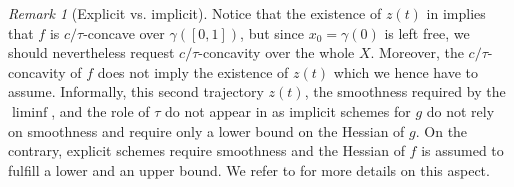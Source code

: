 \documentclass[reqno]{amsart}
\newcounter{results}[section]
\theoremstyle{plain}
\theoremstyle{remark}
\newtheorem{remark}[results]{Remark}
\theoremstyle{plain}
\numberwithin{equation}{section}
\theoremstyle{remark}
\begin{document}
\begin{remark}[Explicit vs. implicit] Notice that the existence of $z(t)$ in  implies that $f$ is $c/\tau$-concave over $\gamma([0,1])$, but since $x_0=\gamma(0)$ is left free, we should nevertheless request $c/\tau$-concavity over the whole $X$. Moreover, the $c/\tau$-concavity of $f$ does not imply the existence of $z(t)$ which we hence have to assume. Informally, this second trajectory $z(t)$, the smoothness required by the $\liminf$, and the role of $\tau$ do not appear in   as  implicit schemes for $g$  do not rely on smoothness  and require only a lower bound on the Hessian of $g$.  On the contrary,  
explicit schemes  require  smoothness and the Hessian of $f$ is assumed to fulfill a lower and an upper bound.    We refer to \cite{leger2023gradient} for more  details  on this aspect.
\end{remark}
\end{document}

